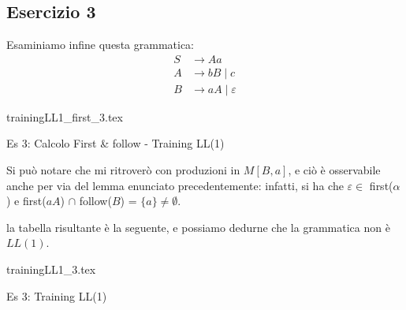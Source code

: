 \documentclass[class=book, crop=false, oneside, 12pt]{standalone}
\begin{document}
\subsection*{Esercizio 3}
Esaminiamo infine questa grammatica:
\begin{align*}
    S &\rightarrow Aa \\
    A &\rightarrow bB \mid c \\
    B &\rightarrow aA \mid \varepsilon
\end{align*}
\begin{table}[H]
    \centering
    {trainingLL1_first_3.tex}
    \caption{Es 3: Calcolo First \& follow - Training LL(1)}
    \label{trainingLL1_first_3}
\end{table}
Si può notare che mi ritroverò con produzioni in \(M[B, a]\), e ciò è osservabile anche per via del lemma enunciato precedentemente: infatti, si ha che \(\varepsilon \in\) first(\(\alpha\)) e first(\(aA\)) \(\cap\) follow(\(B\)) = \(\{a\} \neq \emptyset\).

la tabella risultante è la seguente, e possiamo dedurne che la grammatica non è \(LL(1)\).
\begin{table}[H]
    \centering
	{trainingLL1_3.tex}
    \caption{Es 3: Training LL(1)}
    \label{trainingLL1_3}
\end{table}
\end{document}

